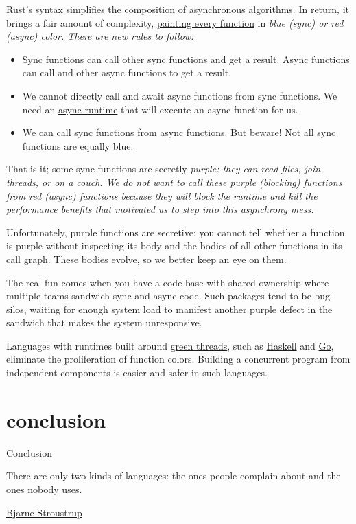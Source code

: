 \documentclass{article}
\begin{document}
Rust's  syntax simplifies the composition of asynchronous algorithms.
In return, it brings a fair amount of complexity, \href{https://journal.stuffwithstuff.com/2015/02/01/what-color-is-your-function/}{painting every function} in \em{blue} (sync) or \em{red} (async) color.
There are new rules to follow:
\begin{itemize}
  \item
    Sync functions can call other sync functions and get a result.
    Async functions can call and  other async functions to get a result.
  \item
    We cannot directly call and await async functions from sync functions.
    We need an \href{#implicit-async-runtimes}{async runtime} that will execute an async function for us.
  \item
    We can call sync functions from async functions.
    But beware!
    Not all sync functions are equally blue.
\end{itemize}

That is it; some sync functions are secretly \em{purple}: they can read files, join threads, or \href{https://doc.rust-lang.org/std/thread/fn.sleep.html}{} on a couch.
We do not want to call these purple (blocking) functions from red (async) functions because they will block the runtime and kill the performance benefits that motivated us to step into this asynchrony mess.

Unfortunately, purple functions are secretive: you cannot tell whether a function is purple without inspecting its body and the bodies of all other functions in its \href{https://en.wikipedia.org/wiki/Call_graph}{call graph}.
These bodies evolve, so we better keep an eye on them.

The real fun comes when you have a code base with shared ownership where multiple teams sandwich sync and async code.
Such packages tend to be bug silos, waiting for enough system load to manifest another purple defect in the sandwich that makes the system unresponsive.

Languages with runtimes built around \href{https://en.wikipedia.org/wiki/Green_thread}{green threads}, such as \href{https://haskell.org/}{Haskell} and \href{https://go.dev/}{Go}, eliminate the proliferation of function colors.
Building a concurrent program from independent components is easier and safer in such languages.

\section{conclusion}{Conclusion}
\epigraph{
    There are only two kinds of languages: the ones people complain about and the ones nobody uses.
}{\href{https://www.stroustrup.com/quotes.html}{Bjarne Stroustrup}}
\end{document}
